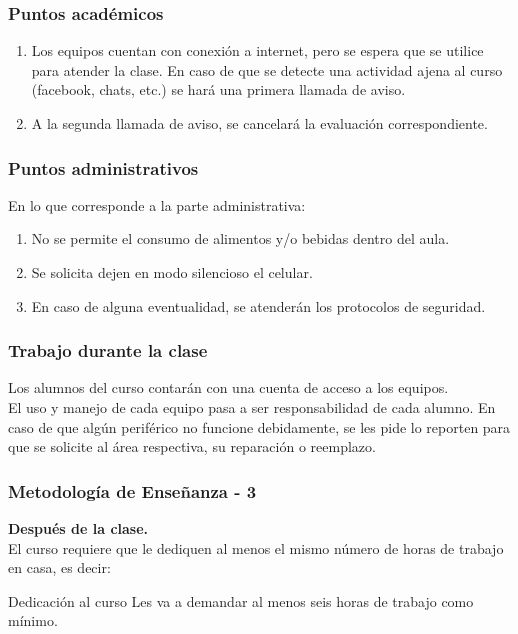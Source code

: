 \documentclass[12pt]{beamer}
\begin{document}
\begin{frame}
\frametitle{Puntos académicos}
\begin{enumerate}[<+->]
\conti    
\item Los equipos cuentan con conexión a internet, pero se espera que se utilice para atender la clase. \pause En caso de que se detecte una actividad ajena al curso (facebook, chats, etc.) se hará una primera llamada de aviso.
\item A la segunda llamada de aviso, se cancelará la evaluación correspondiente.
\end{enumerate}
\end{frame}
\begin{frame}
\frametitle{Puntos administrativos}
En lo que corresponde a la parte administrativa:
\begin{enumerate}[<+->]
\item No se permite el consumo de alimentos y/o bebidas dentro del aula.
\item Se solicita dejen en modo silencioso el celular.
\item En caso de alguna eventualidad, se atenderán los protocolos de seguridad.
\end{enumerate}
\end{frame}
\begin{frame}
\frametitle{Trabajo durante la clase}
Los alumnos del curso contarán con una cuenta de acceso a los equipos.
\\
\bigskip
\pause
El uso y manejo de cada equipo pasa a ser responsabilidad de cada alumno. En caso de que algún periférico no funcione debidamente, se les pide lo reporten para que se solicite al área respectiva, su reparación o reemplazo.
\end{frame}
\begin{frame}
\frametitle{Metodología de Enseñanza - 3}
\textbf{Después de la clase.}
\\
\medskip
El curso \alert{requiere que le dediquen al menos el mismo número de horas de trabajo en casa}, es decir:
\pause
\begin{exampleblock}{Dedicación al curso}
Les va a demandar al menos seis horas de trabajo como mínimo.
\end{exampleblock}
\end{frame}
\end{document}
